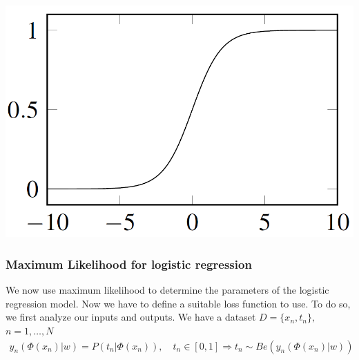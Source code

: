 \documentclass[../main.tex]{subfiles}
\begin{document}
\begin{center}
    \includegraphics[scale=0.4]{images/Sigmoid.PNG}
\end{center}

\subsubsection{Maximum Likelihood for logistic regression}
We now use maximum likelihood to determine the parameters of the logistic regression model. Now we have to define a suitable loss function to use. To do so, we first analyze our inputs and outputs. We have a dataset $D = \{x_n, t_n\},$ $n=1,\dots,N$
\begin{align*}
    y_n(\Phi(x_n)|w) = P(t_n|\Phi(x_n)), \quad t_n \in [0,1] \Rightarrow t_n \sim Be(y_n(\Phi(x_n)|w))
\end{align*}
\end{document}
